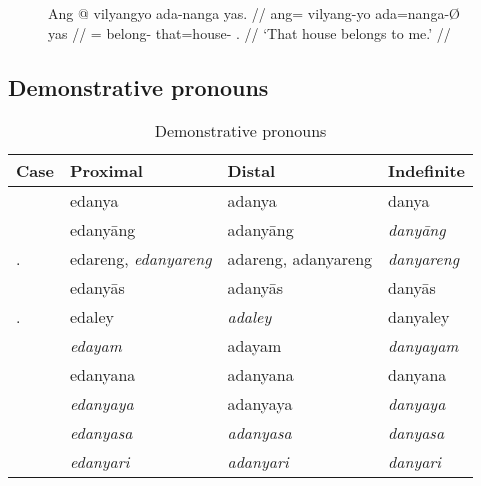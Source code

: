 \begin{figure}[h]
\ex\label{ex:genphrase}%
\begingl
	\gla Ang @ vilyangyo ada-nanga yas. //
	\glb ang= vilyang-yo ada=nanga-Ø yas //
	\glc \AgtT{}= belong-\TsgN{} that=house-\Top{} \Fsg{}.\Parg{} //
	\glft `That house belongs to me.' //
\endgl
\xe
\end{figure}


\subsection{Demonstrative pronouns}
\label{subsec:dempro}

\begin{table}[tp]\centering
\caption{Demonstrative pronouns}

\begin{tabu} to \linewidth{l X[c] X[c] X[c]}
\tableheaderfont\toprule

Case
	& Proximal
	& Distal
	& Indefinite
	\\
\toprule

\Top{}
	& edanya
	& adanya
	& danya
	\\
	
\midrule
	
\Aarg{}
	& edanyāng
	& adanyāng
	& \emph{danyāng}
	\\

\Aarg{}.\Inan{}
	& edareng, \emph{edanyareng}
	& adareng, adanyareng
	& \emph{danyareng}
	\\

\Parg{}
	& edanyās
	& adanyās
	& danyās
	\\

\Parg{}.\Inan{}
	& edaley
	& \emph{adaley}
	& danyaley
	\\

\Dat{}
	& \emph{edayam}
	& adayam
	& \emph{danyayam}
	\\

\midrule

\Gen{}
	& edanyana
	& adanyana
	& danyana
	\\
	
\Loc{}
	& \emph{edanyaya}
	& adanyaya
	& \emph{danyaya}
	\\
	
\Caus{}
	& \emph{edanyasa}
	& \emph{adanyasa}
	& \emph{danyasa}
	\\
	
\Ins{}
	& \emph{edanyari}
	& \emph{adanyari}
	& \emph{danyari}
	\\

\bottomrule
\end{tabu}
\label{tab:detpro}
\end{table}

